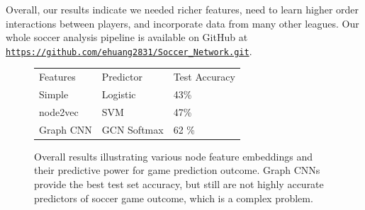 Overall, our results indicate we needed richer features, need to learn higher order interactions between players, and incorporate data from many other leagues. Our whole soccer analysis pipeline is available on GitHub at \texttt{\url{https://github.com/ehuang2831/Soccer_Network.git}}.

\begin{figure}[h]
  \centering
    \begin{tabular}{l | l | l}
        \rowcolor{gray!20}
        Features & Predictor & Test Accuracy  \\
        \noalign{\smallskip}\hline\noalign{\smallskip}
        \rowcolor{green!20}
        Simple &  Logistic & 43\% \\
        \rowcolor{blue!20}
        node2vec &  SVM & 47\% \\
        \rowcolor{purple!20}
        Graph CNN & GCN Softmax & 62 \% \\ 
    \end{tabular}
  \caption{Overall results illustrating various node feature embeddings and their predictive power for game prediction outcome. Graph CNNs provide the best test set accuracy, but still are not highly accurate predictors of soccer game outcome, which is a complex problem.}
    \label{fig:results_table}
\end{figure}


